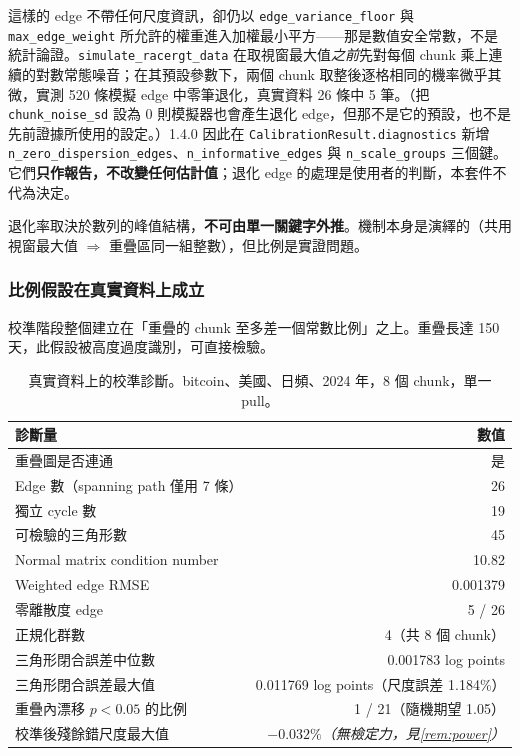 \documentclass[12pt,a4paper,oneside]{article}
\begin{document}
這樣的 edge 不帶任何尺度資訊，卻仍以 \texttt{edge\_\allowbreak variance\_\allowbreak floor} 與 \texttt{max\_\allowbreak edge\_\allowbreak weight} 所允許的權重進入加權最小平方——那是數值安全常數，不是統計論證。\texttt{simulate\_\allowbreak racergt\_\allowbreak data} 在取視窗最大值\emph{之前}先對每個 chunk 乘上連續的對數常態噪音；在其預設參數下，兩個 chunk 取整後逐格相同的機率微乎其微，實測 520 條模擬 edge 中零筆退化，真實資料 26 條中 5 筆。（把 \texttt{chunk\_\allowbreak noise\_\allowbreak sd} 設為 $0$ 則模擬器也會產生退化 edge，但那不是它的預設，也不是先前證據所使用的設定。）1.4.0 因此在 \texttt{CalibrationResult.\allowbreak diagnostics} 新增 \texttt{n\_\allowbreak zero\_\allowbreak dispersion\_\allowbreak edges}、\texttt{n\_\allowbreak informative\_\allowbreak edges} 與 \texttt{n\_scale\_groups} 三個鍵。它們\textbf{只作報告，不改變任何估計值}；退化 edge 的處理是使用者的判斷，本套件不代為決定。

退化率取決於數列的峰值結構，\textbf{不可由單一關鍵字外推}。機制本身是演繹的（共用視窗最大值 $\Rightarrow$ 重疊區同一組整數），但比例是實證問題。

\subsubsection{比例假設在真實資料上成立}

校準階段整個建立在「重疊的 chunk 至多差一個常數比例」之上。重疊長達 150 天，此假設被高度過度識別，可直接檢驗。

\begin{table}[H]
\centering
\small
\caption{真實資料上的校準診斷。bitcoin、美國、日頻、2024 年，8 個 chunk，單一 pull。}
\label{tab:realdata}
\begin{tabular}{lr}
\toprule
診斷量 & 數值\\
\midrule
重疊圖是否連通 & 是\\
Edge 數（spanning path 僅用 7 條） & 26\\
獨立 cycle 數 & 19\\
可檢驗的三角形數 & 45\\
Normal matrix condition number & 10.82\\
Weighted edge RMSE & 0.001379\\
\midrule
零離散度 edge & 5 / 26\\
正規化群數 & 4（共 8 個 chunk）\\
\midrule
三角形閉合誤差中位數 & 0.001783 log points\\
三角形閉合誤差最大值 & 0.011769 log points（尺度誤差 1.184\%）\\
重疊內漂移 $p<0.05$ 的比例 & 1 / 21（隨機期望 1.05）\\
校準後殘餘錯尺度最大值 & $-0.032\%$\emph{（無檢定力，見\cref{rem:power}）}\\
\bottomrule
\end{tabular}
\end{table}
\end{document}

